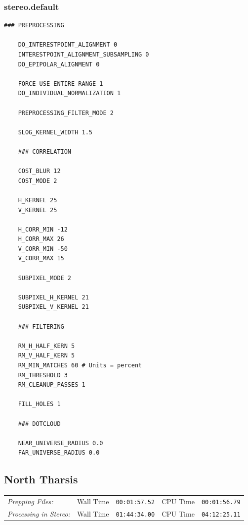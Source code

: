\subsubsection*{stereo.default}

\begin{center}\begin{minipage}{5.5in}
\begin{Verbatim}[frame=single,fontsize=\small,label=stereo.default for MOC Ceraunius Tholus]
    ### PREPROCESSING

    DO_INTERESTPOINT_ALIGNMENT 0
    INTERESTPOINT_ALIGNMENT_SUBSAMPLING 0
    DO_EPIPOLAR_ALIGNMENT 0

    FORCE_USE_ENTIRE_RANGE 1
    DO_INDIVIDUAL_NORMALIZATION 1

    PREPROCESSING_FILTER_MODE 2

    SLOG_KERNEL_WIDTH 1.5

    ### CORRELATION

    COST_BLUR 12
    COST_MODE 2

    H_KERNEL 25
    V_KERNEL 25

    H_CORR_MIN -12
    H_CORR_MAX 26
    V_CORR_MIN -50
    V_CORR_MAX 15

    SUBPIXEL_MODE 2

    SUBPIXEL_H_KERNEL 21
    SUBPIXEL_V_KERNEL 21

    ### FILTERING

    RM_H_HALF_KERN 5
    RM_V_HALF_KERN 5
    RM_MIN_MATCHES 60 # Units = percent
    RM_THRESHOLD 3
    RM_CLEANUP_PASSES 1

    FILL_HOLES 1

    ### DOTCLOUD

    NEAR_UNIVERSE_RADIUS 0.0
    FAR_UNIVERSE_RADIUS 0.0
\end{Verbatim}
\end{minipage}\end{center}

\pagebreak
\subsection{North Tharsis}

\begin{tabular}{l r c r c}
\textit{Prepping Files:}       & Wall Time & \texttt{00:01:57.52} & CPU Time & \texttt{00:01:56.79} \\
\textit{Processing in Stereo:} & Wall Time & \texttt{01:44:34.00} & CPU Time & \texttt{04:12:25.11} \\
\end{tabular}

